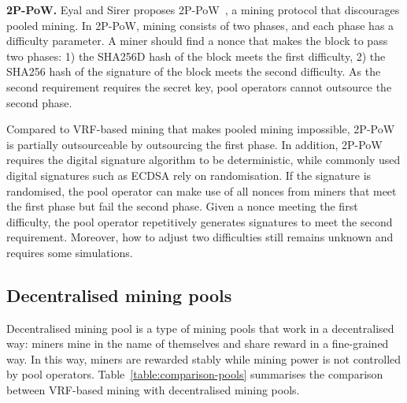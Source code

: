 \textbf{2P-PoW.}
Eyal and Sirer proposes 2P-PoW~\cite{2P-PoW}, a mining protocol that discourages pooled mining.
In 2P-PoW, mining consists of two phases, and each phase has a difficulty parameter.
A miner should find a nonce that makes the block to pass two phases: 1) the SHA256D hash of the block meets the first difficulty, 2) the SHA256 hash of the signature of the block meets the second difficulty.
As the second requirement requires the secret key, pool operators cannot outsource the second phase.

Compared to VRF-based mining that makes pooled mining impossible, 2P-PoW is partially outsourceable by outsourcing the first phase.
In addition, 2P-PoW requires the digital signature algorithm to be deterministic, while commonly used digital signatures such as ECDSA rely on randomisation.
If the signature is randomised, the pool operator can make use of all nonces from miners that meet the first phase but fail the second phase.
Given a nonce meeting the first difficulty, the pool operator repetitively generates signatures to meet the second requirement.
Moreover, how to adjust two difficulties still remains unknown and requires some simulations.




\subsection{Decentralised mining pools}



Decentralised mining pool is a type of mining pools that work in a decentralised way: miners mine in the name of themselves and share reward in a fine-grained way.
In this way, miners are rewarded stably while mining power is not controlled by pool operators.
Table~\ref{table:comparison-pools} summarises the comparison between VRF-based mining with decentralised mining pools.


